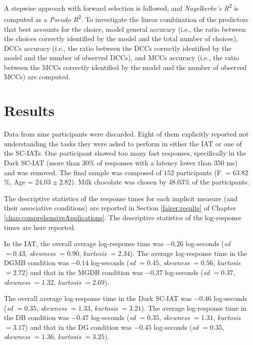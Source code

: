 \documentclass[12pt]{book}
\begin{document}
A stepwise approach with forward selection is followed, and \emph{Nagelkerke's R}\textsuperscript{2} \cite{nagel} is computed as a \emph{Pseudo R}\textsuperscript{2}. 
To investigate the linear combination of the predictors that best accounts for the choice, model general accuracy (i.e., the ratio between the choices correctly identified by the model and the total number of choices), DCCs accuracy (i.e., the ratio between the DCCs correctly identified by the model and the number of observed DCCs), and MCCs accuracy (i.e., the ratio between the MCCs correctly identified by the model and the number of observed MCCs) are computed. 

\section{Results}
Data from nine participants were discarded. Eight of them explicitly reported not understanding the tasks they were asked to perform in either the IAT or one of the SC-IATs. One participant showed too many fast responses, specifically in the Dark SC-IAT (more than $30$\% of responses with a latency lower than 350 ms) and was removed. The final sample was composed of $152$ participants (F $= 63.82$\%, Age = $24.03 \pm 2.82$). Milk chocolate was chosen by $48.03$\% of the participants.

The descriptive statistics of the response times for each implicit measure (and their associative conditions) are reported in Section \ref{fairer:results} of Chapter \ref{chap:comprehensiveApplications}. The descriptive statistics of the log-response times are here reported.

In the IAT, the overall average log-response time was $-0.26$ log-seconds (\emph{sd} $= 0.43$, \emph{skewness} $= 0.90$, \emph{kurtosis} $= 2.34$). The average log-response time in the DGMB condition was $-0.14$ log-seconds (\emph{sd} $= 0.45$, \emph{skewness} $= 0.56$, \emph{kurtosis} $= 2.72$) and that in the MGDB condition was $-0.37$ log-seconds (\emph{sd} $= 0.37$, \emph{skewness} $= 1.32$, \emph{kurtosis} $= 2.69$). 

The overall average log-response time in the Dark SC-IAT was $-0.46$ log-seconds (\emph{sd} $= 0.35$, \emph{skewness} $= 1.33$, \emph{kurtosis} $= 3.21$). The average log-response time in the DB condition was $-0.47$ log-seconds (\emph{sd} $= 0.35$, \emph{skewness} $= 1.31$, \emph{kurtosis} $= 3.17$) and that in the DG condition was $-0.45$ log-seconds (\emph{sd} $= 0.35$, \emph{skewness} $= 1.36$, \emph{kurtosis} $= 3.25$). 
\end{document}
